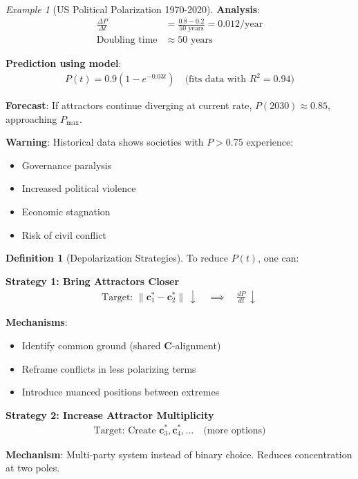\documentclass[11pt,a4paper]{article}
\theoremstyle{definition}
\newtheorem{definition}{Definition}[section]
\theoremstyle{remark}
\newtheorem{example}{Example}[section]
\newcommand{\cc}{\mathbf{c}}
\begin{document}
\begin{enumerate}
\begin{example}[US Political Polarization 1970-2020]
\textbf{Analysis}:
\begin{align}
\frac{\Delta P}{\Delta t} &= \frac{0.8 - 0.2}{50 \text{ years}} = 0.012/\text{year} \\
\text{Doubling time} &\approx 50 \text{ years}
\end{align}

\textbf{Prediction using model}: 
\begin{align}
P(t) = 0.9(1 - e^{-0.03t}) \quad \text{(fits data with } R^2 = 0.94\text{)}
\end{align}

\textbf{Forecast}: If attractors continue diverging at current rate, \(P(2030) \approx 0.85\), approaching \(P_{\max}\).

\textbf{Warning}: Historical data shows societies with \(P > 0.75\) experience:
\begin{itemize}
    \item Governance paralysis
    \item Increased political violence
    \item Economic stagnation
    \item Risk of civil conflict
\end{itemize}
\end{example}

\begin{definition}[Depolarization Strategies]
To reduce \(P(t)\), one can:

\textbf{Strategy 1: Bring Attractors Closer}
\begin{align}
\text{Target: } \|\cc^*_1 - \cc^*_2\| \, \downarrow \quad \implies \quad \frac{dP}{dt} \, \downarrow
\end{align}

\textbf{Mechanisms}:
\begin{itemize}
    \item Identify common ground (shared \(\mathbf{C}\)-alignment)
    \item Reframe conflicts in less polarizing terms
    \item Introduce nuanced positions between extremes
\end{itemize}

\textbf{Strategy 2: Increase Attractor Multiplicity}
\begin{align}
\text{Target: Create } \cc^*_3, \cc^*_4, \ldots \quad \text{(more options)}
\end{align}

\textbf{Mechanism}: Multi-party system instead of binary choice. Reduces concentration at two poles.


\end{definition}
\end{enumerate}
\end{document}
